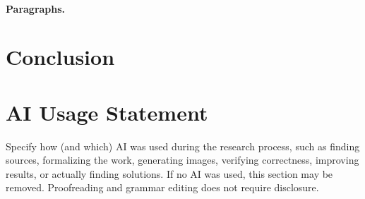 \documentclass[10pt]{hackr26}
\begin{document}
\paragraph{Paragraphs.}\lipsum[3]
\section{Conclusion} \label{sec:conc}

\lipsum[2-3]





\section*{AI Usage Statement}
Specify how (and which) AI was used during the research process, such as finding sources, formalizing the work, generating images, verifying correctness, improving results, or actually finding solutions. If no AI was used, this section may be removed. Proofreading and grammar editing does not require disclosure.



\small









\end{document}
